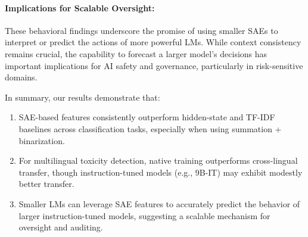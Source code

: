 \paragraph{Implications for Scalable Oversight:}
These behavioral findings underscore the promise of using smaller SAEs to interpret or predict the actions of more powerful LMs. While context consistency remains crucial, the capability to forecast a larger model’s decisions has important implications for AI safety and governance, particularly in risk-sensitive domains.

\bigskip
\noindent
In summary, our results demonstrate that:
\begin{enumerate}
    \item SAE-based features consistently outperform hidden-state and TF-IDF baselines across classification tasks, especially when using summation + binarization.
    \item For multilingual toxicity detection, native training outperforms cross-lingual transfer, though instruction-tuned models (e.g., 9B-IT) may exhibit modestly better transfer.
    \item Smaller LMs can leverage SAE features to accurately predict the behavior of larger instruction-tuned models, suggesting a scalable mechanism for oversight and auditing.
\end{enumerate}

